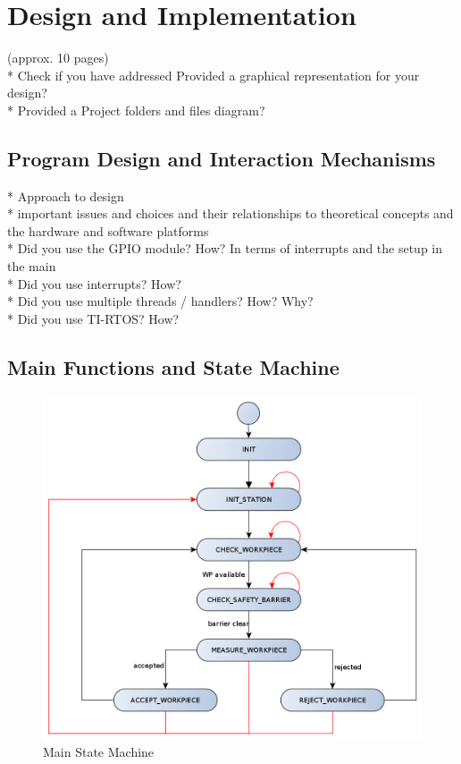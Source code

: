 \chapter{Design and Implementation}

(approx. 10 pages)\\

* Check if you have addressed Provided a graphical representation for your design?\\
* Provided a Project folders and files diagram?\\

\section{Program Design and Interaction Mechanisms} %
* Approach to design\\
* important issues and choices and their relationships to theoretical concepts and the hardware and software platforms\\
* Did you use the GPIO module? How? In terms of interrupts and the setup in the main\\
* Did you use interrupts? How?\\ 
* Did you use multiple threads / handlers? How? Why?\\
* Did you use TI-RTOS? How?\\

\section{Main Functions and State Machine} %

\begin{figure}[H]
	\begin{center}
		\includegraphics[scale=.50]{media/StateMachine_Main.png} 	
		\caption{Main State Machine}
		\label{fig:statemachine}
	\end{center}
\end{figure}

